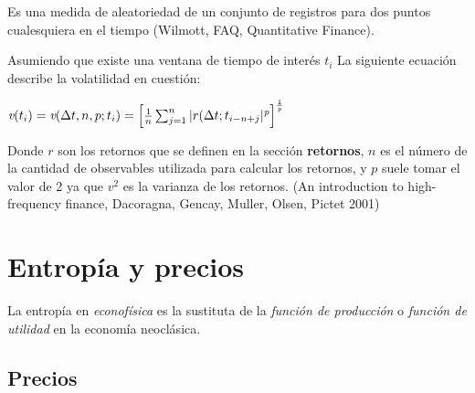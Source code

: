 Es una medida de aleatoriedad de un conjunto de registros para dos puntos cualesquiera en el tiempo (Wilmott, FAQ, Quantitative Finance). 

Asumiendo que existe una ventana de tiempo de interés  $t_{i}$ La siguiente ecuación describe la volatilidad en cuestión:

\begin{center}

$\textit{v}(t_{i}) = \textit{v}(\Delta t, n, p; t_{i}) = \Bigl[ \frac{1}{n} \sum_{j = 1}^{n} |r (\Delta t ; t_{i-n+j}|^{\textit{p}} \Bigr]^\frac{1}{\textit{p}}$

\end{center}

Donde $\textit{r}$ son los retornos que se definen en la sección \textbf{retornos}, $\textit{n}$ es el número de la cantidad de observables utilizada para calcular los retornos, y $\textit{p}$ suele tomar el valor de 2 ya que $\textit{v}^{2}$ es la varianza de los retornos.  (An introduction to high-frequency finance, Dacoragna, Gencay, Muller, Olsen, Pictet 2001)



%
%
%
%
%
\chapter{Entropía y precios}
\label{sec:related}


La entropía en \textit{econofísica} es la sustituta de la \textit{función de producción} o \textit{función de utilidad} en la economía neoclásica. 

\section{ Precios }


\label{sec:precios}

